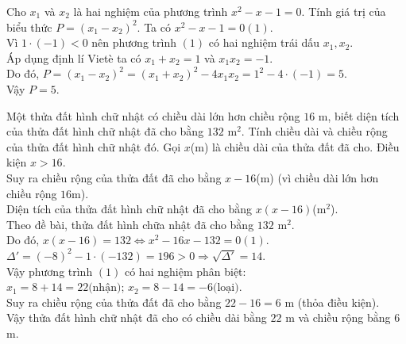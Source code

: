 \begin{ex}%
    Cho $x_1$ và $x_2$ là hai nghiệm của phương trình $x^2 -x -1=0$. Tính giá trị của biểu thức $P=(x_1 - x_2)^2$.
\loigiai
    {
    Ta có $x^2-x-1=0 (1)$.\\
    Vì $1 \cdot (-1)<0$ nên phương trình $(1)$ có hai nghiệm trái dấu $x_1, x_2$.\\
    Áp dụng định lí Vietè ta có $x_1+x_2=1$ và $x_1 x_2=-1$.\\
    Do đó, $P=(x_1-x_2)^2=(x_1+x_2)^2-4 x_1 x_2=1^2-4 \cdot(-1)=5$.\\
    Vậy $P=5$.\\
    }
\end{ex}

\begin{ex}%
    Một thửa đất hình chữ nhật có chiều dài lớn hơn chiều rộng $16$ m, biết diện tích của thửa đất hình chữ nhật đã cho bằng $132$ m$^2$. Tính chiều dài và chiều rộng của thửa đất hình chữ nhật đó. 
\loigiai
    {
   	Gọi $x$(m) là chiều dài của thửa đất đã cho. Điều kiện $x >16$.\\
   	Suy ra chiều rộng của thửa đất đã cho bằng $x-16$(m) (vì chiều dài lớn hơn chiều rộng $16$m).\\
   	Diện tích của thửa đất hình chữ nhật đã cho bằng $x(x-16)$(m$^2$).\\
   	Theo đề bài, thửa đất hình chữa nhật đã cho bằng $132$ m$^2$.\\
   	Do đó, $x(x-16)=132 \Leftrightarrow x^2-16x-132=0 (1)$.\\
   	$\Delta'=(-8)^2-1 \cdot (-132)=196>0 \Rightarrow \sqrt{\Delta'}=14$.\\
   	Vậy phương trình $(1)$ có hai nghiệm phân biệt:\\
   	$x_1=8+14=22 \mbox{(nhận)}$; $x_2=8-14=-6 \mbox{(loại)}$.\\
   	Suy ra chiều rộng của thửa đất đã cho bằng $22-16=6$ m (thỏa điều kiện).\\
   	Vậy thửa đất hình chữ nhật đã cho có chiều dài bằng $22$ m và chiều rộng bằng $6$ m.
}

\end{ex}

